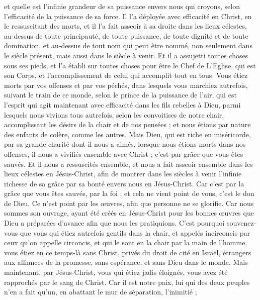 \begin{multicols}{2}
et quelle est l’infinie grandeur de sa puissance envers nous qui croyons, selon l’efficacité de la puissance de sa force.
Il l’a déployée avec efficacité en Christ, en le ressuscitant des morts, et il l’a fait asseoir à sa droite dans les lieux célestes,
au-dessus de toute principauté, de toute puissance, de toute dignité et de toute domination, et au-dessus de tout nom qui peut être nommé, non seulement dans le siècle présent, mais aussi dans le siècle à venir.
Et il a assujetti toutes choses sous ses pieds, et l'a établi sur toutes choses pour être le Chef de L’Eglise,
qui est son Corps, et l'accomplissement de celui qui accomplit tout en tous.
\VerseOne{}Vous étiez morts par vos offenses et par vos péchés,
dans lesquels vous marchiez autrefois, suivant le train de ce monde, selon le prince de la puissance de l'air, qui est l'esprit qui agit maintenant avec efficacité dans les fils rebelles à Dieu,
parmi lesquels nous vivions tous autrefois, selon les convoitises de notre chair, accomplissant les désirs de la chair et de nos pensées ; et nous étions par nature des enfants de colère, comme les autres.
Mais Dieu, qui est riche en miséricorde, par sa grande charité dont il nous a aimés,
lorsque nous étions morts dans nos offenses, il nous a vivifiés ensemble avec Christ ; c’est par grâce que vous êtes sauvés.
Et il nous a ressuscités ensemble, et nous a fait asseoir ensemble dans les lieux célestes en Jésus-Christ,
afin de montrer dans les siècles à venir l’infinie richesse de sa grâce par sa bonté envers nous en Jésus-Christ.
Car c’est par la grâce que vous êtes sauvés, par la foi ; et cela ne vient point de vous, c'est le don de Dieu.
Ce n’est point par les œuvres, afin que personne ne se glorifie.
Car nous sommes son ouvrage, ayant été créés en Jésus-Christ pour les bonnes œuvres que Dieu a préparées d’avance afin que nous les pratiquions.
C'est pourquoi souvenez-vous que vous qui étiez autrefois gentils dans la chair, et appelés incirconcis par ceux qu’on appelle circoncis, et qui le sont en la chair par la main de l’homme,
vous étiez en ce temps-là sans Christ, privés du droit de cité en Israël, étrangers aux alliances de la promesse, sans espérance, et sans Dieu dans le monde.
Mais maintenant, par Jésus-Christ, vous qui étiez jadis éloignés, vous avez été rapprochés par le sang de Christ.
Car il est notre paix, lui qui des deux peuples n’en a fait qu’un, en abattant le mur de séparation, l’inimitié ;

\end{multicols}
